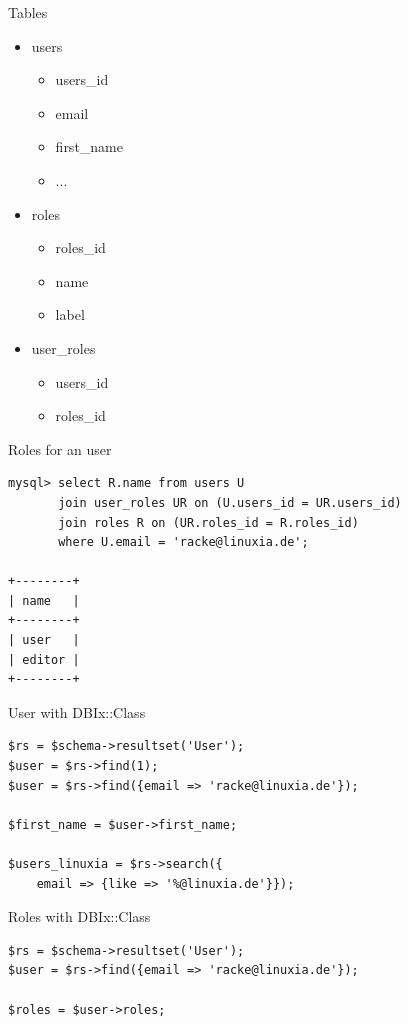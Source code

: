 \begin{frame}{Tables}
\begin{itemize}
\item users
\begin{itemize}
\item users\_id
\item email
\item first\_name
\item ...
\end{itemize}
\item roles
\begin{itemize}
\item roles\_id
\item name
\item label
\end{itemize}
\item user\_roles
\begin{itemize}
\item users\_id
\item roles\_id
\end{itemize}
\end{itemize}
\end{frame}

\begin{frame}[fragile]{Roles for an user}
\begin{lstlisting}
mysql> select R.name from users U
       join user_roles UR on (U.users_id = UR.users_id)
       join roles R on (UR.roles_id = R.roles_id)
       where U.email = 'racke@linuxia.de';

+--------+
| name   |
+--------+
| user   |
| editor |
+--------+
\end{lstlisting}
\end{frame}

\begin{frame}[fragile]{User with DBIx::Class}
\begin{lstlisting}
$rs = $schema->resultset('User');
$user = $rs->find(1);
$user = $rs->find({email => 'racke@linuxia.de'});

$first_name = $user->first_name;

$users_linuxia = $rs->search({
    email => {like => '%@linuxia.de'}});
\end{lstlisting}
\end{frame}

\begin{frame}[fragile]{Roles with DBIx::Class}
\begin{lstlisting}
$rs = $schema->resultset('User');
$user = $rs->find({email => 'racke@linuxia.de'});

$roles = $user->roles;
\end{lstlisting}
\end{frame}

